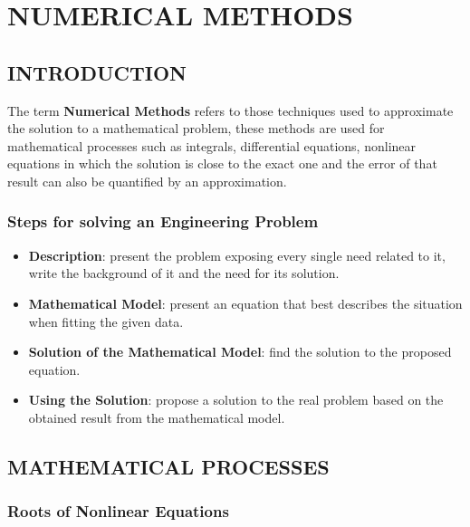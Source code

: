 \documentclass[12pt]{report}
\begin{document}
	
	\part{NUMERICAL METHODS}
	
	\chapter{INTRODUCTION}

        \par The term \textbf{Numerical Methods} refers to those techniques used to approximate the solution to a mathematical problem, these methods are used for mathematical processes such as integrals, differential equations, nonlinear equations in which the solution is close to the exact one and the error of that result can also be quantified by an approximation.

        \section{Steps for solving an Engineering Problem}

        \begin{itemize}
        \item \textbf{Description}: present the problem exposing every single need related to it, write the background of it and the need for its solution.
        \item \textbf{Mathematical Model}: present an equation that best describes the situation when fitting the given data.
        \item \textbf{Solution of the Mathematical Model}: find the solution to the proposed equation.
        \item \textbf{Using the Solution}: propose a solution to the real problem based on the obtained result from the mathematical model.
        \end{itemize}
	
	\chapter{MATHEMATICAL PROCESSES}

        \section{Roots of Nonlinear Equations}
\end{document}
